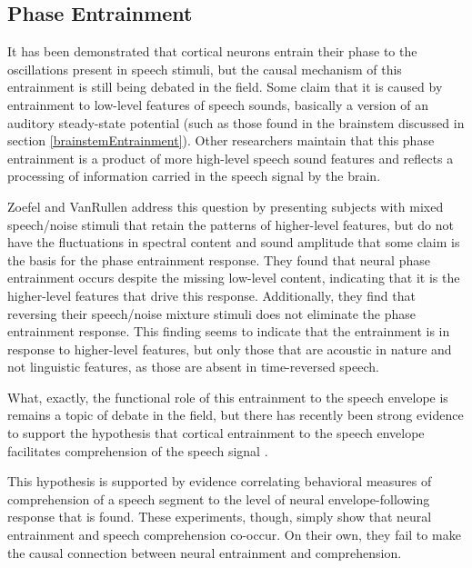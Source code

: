 \documentclass[titlepage]{article}
\begin{document}
  \subsection{Phase Entrainment}

    It has been demonstrated that cortical neurons entrain their phase to the
    oscillations present in speech stimuli, but the causal mechanism of this
    entrainment is still being debated in the field. Some claim that it is
    caused by entrainment to low-level features of speech sounds, basically a
    version of an auditory steady-state potential (such as those found in the
    brainstem discussed in section \ref{brainstemEntrainment}). Other
    researchers maintain that this phase entrainment is a product of more
    high-level speech sound features and reflects a processing of information
    carried in the speech signal by the brain.

    Zoefel and VanRullen \cite{Zoefel2016} address this question by presenting
    subjects with mixed speech/noise stimuli that retain the patterns of
    higher-level features, but do not have the fluctuations in spectral content
    and sound amplitude that some claim is the basis for the phase entrainment
    response. They found that neural phase entrainment occurs despite the
    missing low-level content, indicating that it is the higher-level features
    that drive this response. Additionally, they find that reversing their
    speech/noise mixture stimuli does not eliminate the phase entrainment
    response. This finding seems to indicate that the entrainment is in
    response to higher-level features, but only those that are acoustic in
    nature and not linguistic features, as those are absent in time-reversed
    speech.

    What, exactly, the functional role of this entrainment to the speech
    envelope is remains a topic of debate in the field, but there has recently
    been strong evidence to support the hypothesis that cortical entrainment to
    the speech envelope facilitates comprehension of the speech signal
    \cite{Ding2014a,Ding2012,OSullivan2015}.


    This hypothesis is supported by evidence correlating behavioral measures of
    comprehension of a speech segment to the level of neural envelope-following
    response that is found. These experiments, though, simply show that neural
    entrainment and speech comprehension co-occur. On their own, they fail to
    make the causal connection between neural entrainment and comprehension.
\end{document}
